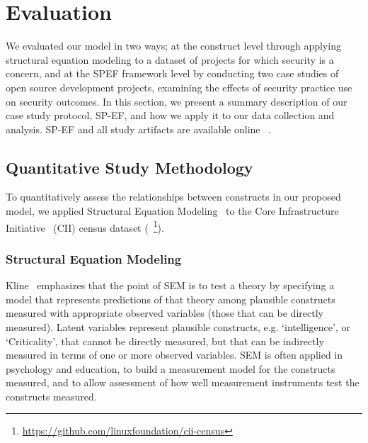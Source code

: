 \section{Evaluation}
\label{sec:evaluation}

We evaluated our model in two ways; at the construct level through applying structural equation modeling to a dataset of projects for which security is a concern, and at the SPEF framework level by conducting two case studies of open source development projects, examining the effects of security practice use on security outcomes. In this section, we present a summary description of our case study protocol, SP-EF, and how we apply it to our data collection and analysis. SP-EF and all study artifacts are available online ~\cite{morrison2016spef}. 

\subsection{Quantitative Study Methodology}

To quantitatively assess the relationships between constructs in our proposed model, we applied Structural Equation Modeling~\cite{kline2015principles} to the Core Infrastructure Initiative~\cite{lf2016cii} (CII) census dataset (~\footnote{\url{https://github.com/linuxfoundation/cii-census}}). 

\subsubsection{Structural Equation Modeling}

Kline~\cite{kline2015principles} emphasizes that the point of SEM is to test a theory by specifying a model that represents predictions of that theory among plausible constructs measured with appropriate observed variables (those that can be directly measured). Latent variables represent plausible constructs, e.g. ‘intelligence’, or ‘Criticality’, that cannot be directly measured, but that can be indirectly measured in terms of one or more observed variables. SEM is often applied in psychology and education, to build a measurement model for the constructs measured, and to allow assessment of how well measurement instruments test the constructs measured. 

